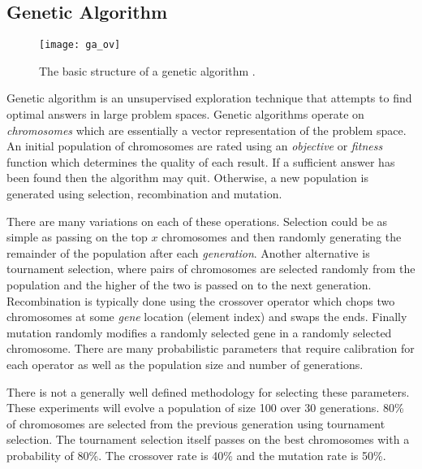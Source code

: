 \subsection{Genetic Algorithm}
\begin{figure}[h]
\centering
\texttt{[image: ga\_ov]}
\caption{The basic structure of a genetic algorithm \cite{geatbx}.}
\label{f:ga_ov}
\end{figure}

	Genetic algorithm is an unsupervised exploration technique that attempts to find optimal answers in large problem spaces. 
	Genetic algorithms operate on \emph{chromosomes} which are essentially a vector representation of the problem space.
	An initial population of chromosomes are rated using an \emph{objective} or \emph{fitness} function which determines the quality of each result. 
	If a sufficient answer has been found then the algorithm may quit.
	Otherwise, a new population is generated using selection, recombination and mutation. 
	
	There are many variations on each of these operations. Selection could be as simple as passing on the top $x$ chromosomes and then randomly generating the remainder of the population after each \emph{generation}. 
	Another alternative is tournament selection, where pairs of chromosomes are selected randomly from the population and the higher of the two is passed on to the next generation. 
	Recombination is typically done using the crossover operator which chops two chromosomes at some \emph{gene} location (element index) and swaps the ends.
	Finally mutation randomly modifies a randomly selected gene in a randomly selected chromosome.
	There are many probabilistic parameters that require calibration for each operator as well as the population size and number of generations.
	
	There is not a generally well defined methodology for selecting these parameters. These experiments will evolve a population of size 100 over 30 generations. 80\% of chromosomes are selected from the previous generation using tournament selection. The tournament selection itself passes on the best chromosomes with a probability of 80\%. The crossover rate is 40\% and the mutation rate is 50\%.

